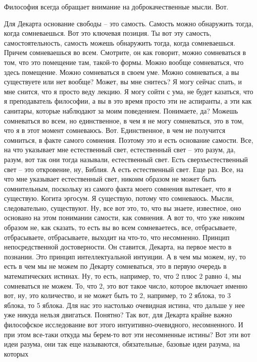 Философия
всегда обращает внимание на доброкачественные мысли. Вот. 

Для Декарта основание
свободы – это самость. Самость можно обнаружить тогда, когда сомневаешься. Вот
это ключевая позиция. Ты вот эту самость, самостоятельность, самость можешь
обнаружить тогда, когда сомневаешься. Причем сомневаешься во всем. Смотрите, он
как говорит, можно сомневаться в том, что это помещение там, такой-то формы.
Можно вообще сомневаться, что здесь помещение. Можно сомневаться в своем уме.
Можно сомневаться, а вы существуете или нет вообще? Может, вы мне снитесь? Я
могу сейчас спать, и мне снится, что я просто веду лекцию. Я могу сойти с ума,
не будет казаться, что я преподаватель философии, а вы в это время просто эти не
аспиранты, а эти как санитары, которые наблюдают за моим поведением. Понимаете,
да? Можешь сомневаться во всем, но единственное, в чем я не могу сомневаться,
это в том, что я в этот момент сомневаюсь. Вот. Единственное, в чем не получится
сомниться, в факте самого сомнения. Поэтому это и есть основание самости. Все,
на что указывает мне естественный свет, естественный свет – это разум, да,
разум, вот так они тогда называли, естественный свет. Есть сверхъестественный
свет – это откровение, ну, Библия. А есть естественный свет. Еще раз. Все, на
что мне указывает естественный свет, никоим образом не может быть сомнительным,
поскольку из самого факта моего сомнения вытекает, что я существую. Когита
эргосум. Я существую, потому что сомневаюсь. Мысли, следовательно, существуют.
Ну, все вот это, то, что вы знаете, известное, оно основано на этом понимании
самости, как сомнения. А вот то, что уже никоим образом не, как сказать, то есть
вы во всем сомневаетесь, все, отбрасываете, отбрасываете, отбрасываете, выходит
на что-то, что несомненно. Принцип непосредственной достоверности. Он ставится,
Декарта, на первое место в познании. Это принцип интеллектуальной интуиции. А в
чем мы можем, ну, то есть в чем мы не можем по Декарту сомневаться, это в первую
очередь в математических истинах. Ну, то есть, например, то, что 2 плюс 2 равно
4, мы сомневаться не можем. То, что 2, это вот такое число, которое включает
именно вот, ну, это количество, и не может быть то 2, например, то 2 яблока, то
3 яблока, то 5 яблока. Для нас это настолько очевидная истина, что дальше у нее
уже никуда нельзя двигаться. Понятно? Так вот, для Декарта крайне важно
философское исследование вот этого интуитивно-очевидного, несомненного. И при
этом все-таки откуда мы берем-то вот эти несомненные истины? Вот эти вот идеи
разума, они так еще называются, обязательные, базовые идеи разума, на которых
